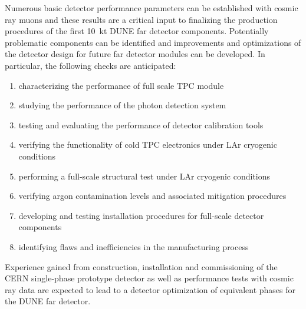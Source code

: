 Numerous basic detector performance parameters can be established with cosmic ray muons and these results are a critical input to finalizing the production procedures of the first 10~kt DUNE far detector components. Potentially problematic components can be identified and improvements and optimizations of the detector design for future far detector modules can be developed. 
%
In particular, the following checks are anticipated:
\begin{enumerate}
 \item characterizing the performance of full scale TPC module
 \item studying the performance of the photon detection system
 \item testing and evaluating the performance of detector calibration tools
  \item verifying the functionality of cold TPC electronics under LAr cryogenic conditions
  \item performing a full-scale structural test under LAr cryogenic conditions
  \item verifying argon contamination levels and associated mitigation procedures
  \item developing and testing installation procedures for full-scale detector components
  \item identifying flaws and inefficiencies in the manufacturing process
\end{enumerate}

Experience gained from construction, installation and commissioning of the CERN single-phase prototype detector 
as well as performance tests with cosmic ray data are expected to lead to a detector optimization of equivalent phases 
for the DUNE far detector. 

